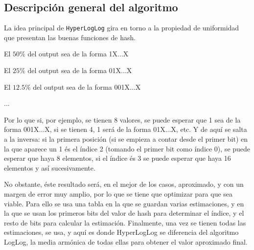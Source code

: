 \subsection{Descripción general del algoritmo}
La idea principal de \texttt{HyperLogLog} gira en torno a la propiedad de uniformidad que presentan las buenas
funciones de hash.

	El $50\%$ del output sea de la forma 1X...X
	
	El $25\%$ del output sea de la forma 01X...X
	
	El $12.5\%$ del output sea de la forma 001X...X
	
	...
	
Por lo que si, por ejemplo, se tienen 8 valores, se puede esperar que 1 sea de la forma 001X...X,
si se tienen 4, 1 será de la forma 01X...X, etc. Y de aquí se salta a la inversa: si la primera
posición (si se empieza a contar desde el primer bit) en la que aparece un 1 és el índice 2 (tomando
el primer bit como índice 0), se puede esperar que haya 8 elementos, si el índice és 3 se puede
esperar que haya 16 elementos y así sucesivamente.

No obstante, éste resultado será, en el mejor de los casos, aproximado, y con un margen de error
muy amplio, por lo que se tiene que optimizar para que sea viable. Para ello se usa una tabla en la
que se guardan varias estimaciones, y en la que se usan los primeros bits del valor de hash para
determinar el índice, y el resto de bits para calcular la estimación. Finalmente, una vez se tienen
todas las estimaciones, se usa, y aquí es donde HyperLogLog se diferencia del algoritmo LogLog,
la media armónica de todas ellas para obtener el valor aproximado final.

